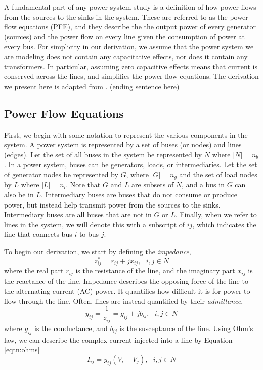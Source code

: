 A fundamental part of any power system study is a definition of how power flows from the sources to the sinks in the system.  These are referred to as the power flow equations (PFE), and they describe the the output power of every generator (sources) and the power flow on every line given the consumption of power at every bus.  For simplicity in our derivation, we assume that the power system we are modeling does not contain any capacitative effects, nor does it contain any transformers.  In particular, assuming zero capacitive effects means that current is conserved across the lines, and simplifies the power flow equations.  The derivation we present here is adapted from \cite{Bienstock2015}.  (ending sentence here)

\subsection{Power Flow Equations}
\label{sec:pfe}
First, we begin with some notation to represent the various components in the system.  A power system is represented by a set of buses (or nodes) and lines (edges).  Let the set of all buses in the system be represented by $N$ where $|N| = n_b$.  In a power system, buses can be generators, loads, or intermediaries.  Let the set of generator nodes be represented by $G$, where $|G| = n_g$ and the set of load nodes by $L$ where $|L|=n_l$.  Note that $G$ and $L$ are subsets of $N$, and a bus in $G$ can also be in $L$.  Intermediary buses are buses that do not consume or produce power, but instead help transmit power from the sources to the sinks.  Intermediary buses are all buses that are not in $G$ or $L$.  Finally, when we refer to lines in the system, we will denote this with a subscript of $ij$, which indicates the line that connects bus $i$ to bus $j$.

To begin our derivation, we start by defining the \textit{impedance},
\begin{equation}
\label{eqtn:impedance}
z_{ij}^* = r_{ij}+jx_{ij},\ \ \ i,j \in N	
\end{equation}
 where the real part $r_{ij}$ is the resistance of the line, and the imaginary part $x_{ij}$ is the reactance of the line.  Impedance describes the opposing force of the line to the alternating current (AC) power.  It quantifies how difficult it is for power to flow through the line.  Often, lines are instead quantified by their \textit{admittance},
\begin{equation}
\label{eqtn:admmitance}
y_{ij} = \frac{1}{z_{ij}} = g_{ij} + jb_{ij}	,\ \ \ i,j \in N	
\end{equation}
where $g_{ij}$ is the conductance, and $b_{ij}$ is the susceptance of the line.  Using Ohm's law, we can describe the complex current injected into a line by Equation \ref{eqtn:ohms}
\begin{equation}
\label{eqtn:ohms}
I_{ij} = y_{ij} (V_i-V_j)	,\ \ \ i,j \in N
\end{equation}

